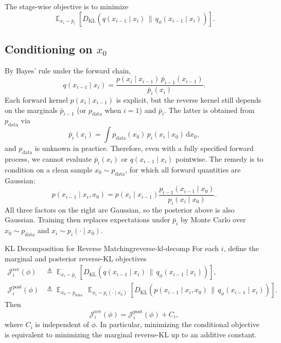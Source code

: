 \documentclass[11pt,a4paper]{article}
\renewcommand{\d}{\mathrm{d}}
\DeclareMathOperator*{\E}{\mathbb{E}}
\newcommand{\KL}[2]{D_{\mathrm{KL}}\!\left(#1\,\|\,#2\right)}
\newcommand{\pdata}{p_{\mathrm{data}}}
\newcommand{\bpMarg}[1]{\bar p_{#1}}
\begin{document}
The stage-wise objective is to minimize
\[
\E_{x_i\sim \bpMarg{i}}\!\left[\KL{q(x_{i-1}\mid x_i)}{q_\phi(x_{i-1}\mid x_i)}\right].
\]

\subsection{Conditioning on \texorpdfstring{$x_0$}{x0}}

By Bayes' rule under the forward chain,
\[
q(x_{i-1}\mid x_i)
=\frac{p(x_i\mid x_{i-1})\,\bpMarg{i-1}(x_{i-1})}{\bpMarg{i}(x_i)}.
\]
Each forward kernel $p(x_i\mid x_{i-1})$ is explicit, but the reverse kernel still depends on the marginals $\bpMarg{i-1}$ (or $\pdata$ when $i=1$) and $\bpMarg{i}$.
The latter is obtained from $\pdata$ via
\[
\bpMarg{i}(x_i)=\int \pdata(x_0)\,p_i(x_i\mid x_0)\,\d x_0,
\]
and $\pdata$ is unknown in practice.
Therefore, even with a fully specified forward process, we cannot evaluate $\bpMarg{i}(x_i)$ or $q(x_{i-1}\mid x_i)$ pointwise.
The remedy is to condition on a clean sample $x_0\sim\pdata$, for which all forward quantities are Gaussian:
\[
p(x_{i-1}\mid x_i,x_0)
=p(x_i\mid x_{i-1})\frac{p_{i-1}(x_{i-1}\mid x_0)}{p_i(x_i\mid x_0)}.
\]
All three factors on the right are Gaussian, so the posterior above is also Gaussian.
Training then replaces expectations under $\bpMarg{i}$ by Monte Carlo over $x_0\sim\pdata$ and $x_i\sim p_i(\cdot\mid x_0)$.

\begin{theorem}[breakable=false]{KL Decomposition for Reverse Matching}{reverse-kl-decomp}
For each $i$, define the marginal and posterior reverse-KL objectives
\begin{align*}
\mathcal{J}^{\mathrm{rev}}_i(\phi)
&\triangleq \E_{x_i\sim \bpMarg{i}}\!\left[\KL{q(x_{i-1}\mid x_i)}{q_\phi(x_{i-1}\mid x_i)}\right],\\
\mathcal{J}^{\mathrm{post}}_i(\phi)
&\triangleq \E_{x_0\sim\pdata}\,\E_{x_i\sim p_i(\cdot\mid x_0)}
\!\left[\KL{p(x_{i-1}\mid x_i,x_0)}{q_\phi(x_{i-1}\mid x_i)}\right].
\end{align*}
Then
\[
\mathcal{J}^{\mathrm{rev}}_i(\phi)=\mathcal{J}^{\mathrm{post}}_i(\phi)+C_i,
\]
where $C_i$ is independent of $\phi$.
In particular, minimizing the conditional objective is equivalent to minimizing the marginal reverse-KL up to an additive constant.
\end{theorem}
\end{document}
